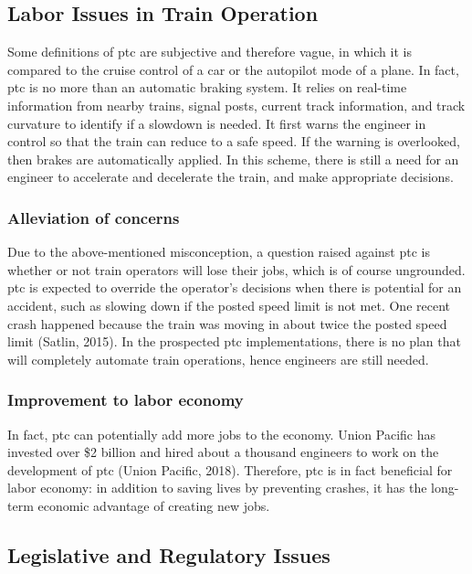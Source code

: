 \documentclass[11pt, titlepage]{article}
\begin{document}
\subsection{Labor Issues in Train Operation}

Some definitions of \gls{ptc} are subjective and therefore vague, in which it is
compared to the cruise control of a car or the autopilot mode of a plane. In fact,
\gls{ptc} is no more than an automatic braking system. It relies on real-time
information from nearby trains, signal posts, current track information, and track
curvature to identify if a slowdown is needed. It first warns the engineer in
control so that the train can reduce to a safe speed. If the warning is overlooked,
then brakes are automatically applied. In this scheme, there is still a need for an
engineer to accelerate and decelerate the train, and make appropriate decisions.

\subsubsection{Alleviation of concerns}

Due to the above-mentioned misconception, a question raised against \gls{ptc} is
whether or not train operators will lose their jobs, which is of course ungrounded.
\gls{ptc} is expected to override the operator’s decisions when there is potential
for an accident, such as slowing down if the posted speed limit is not met. One
recent crash happened because the train was moving in about twice the posted speed
limit (Satlin, 2015). In the prospected \gls{ptc} implementations, there is no plan
that will completely automate train operations, hence engineers are still needed.

\subsubsection{Improvement to labor economy}

In fact, \gls{ptc} can potentially add more jobs to the economy. Union Pacific has
invested over \$2 billion and hired about a thousand engineers to work on the
development of \gls{ptc} (Union Pacific, 2018). Therefore, \gls{ptc} is in fact
beneficial for labor economy: in addition to saving lives by preventing crashes, it
has the long-term economic advantage of creating new jobs.

\subsection{Legislative and Regulatory Issues}
\end{document}
